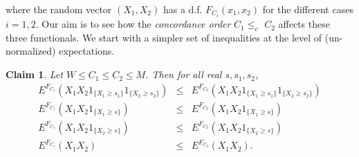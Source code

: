 \documentclass[onecolumn]{article}
\newtheorem{claim}[theorem]{Claim}
\begin{document}
where the random vector $(X_{1},X_{2})$ has a d.f. $F_{C_{i}}(x_{1},x_{2})$
for the different cases $i=1,2$. Our aim is to see how the \textit{%
concordance order} $C_{1}\leq _{c}$ $C_{2}$ affects these three functionals.
We start with a simpler set of inequalities at the level of (un-normalized)
expectations.

\begin{claim}
\label{com-claim1} Let $W\leq C_{1}\leq C_{2}\leq M$. Then for all real $%
s,s_{1},s_{2}$,%
\begin{eqnarray}
E^{F_{C_{1}}}(X_{1}X_{2}1_{\{X_{1}\geq s_{1}\}}1_{\{X_{2}\geq s_{2}\}})
&\leq &E^{F_{C_{2}}}(X_{1}X_{2}1_{\{X_{1}\geq s_{1}\}}1_{\{X_{2}\geq
s_{2}\}})  \label{223.1} \\
E^{F_{C_{1}}}(X_{1}X_{2}1_{\{X_{1}\geq s\}}) &\leq
&E^{F_{C_{2}}}(X_{1}X_{2}1_{\{X_{1}\geq s\}})  \label{223.2} \\
E^{F_{C_{1}}}(X_{1}X_{2}1_{\{X_{2}\geq s\}}) &\leq
&E^{F_{C_{2}}}(X_{1}X_{2}1_{\{X_{2}\geq s\}})  \label{224} \\
E^{F_{C_{1}}}(X_{1}X_{2}) &\leq &E^{F_{C_{2}}}(X_{1}X_{2}).  \label{225}
\end{eqnarray}
\end{claim}
\end{document}
